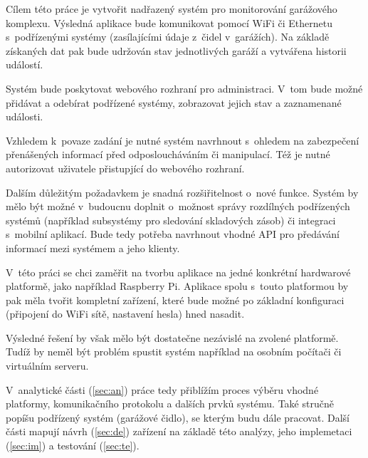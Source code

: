 Cílem této práce je vytvořit nadřazený systém pro monitorování garážového komplexu. Výsledná aplikace bude komunikovat pomocí WiFi či Ethernetu s~podřízenými systémy (zasílajícími údaje z~čidel v~garážích). Na základě získaných dat pak bude udržován stav jednotlivých garáží a vytvářena historii událostí.

Systém bude poskytovat webového rozhraní pro administraci. V~tom bude možné přidávat a odebírat podřízené systémy, zobrazovat jejich stav a zaznamenané události.

Vzhledem k~povaze zadání je nutné systém navrhnout s~ohledem na zabezpečení přenášených informací před odposloucháváním či manipulací. Též je nutné autorizovat uživatele přistupjící do webového rozhraní.

Dalším důležitým požadavkem je snadná rozšiřitelnost o~nové funkce. Systém by mělo být možné v~budoucnu doplnit o~možnost správy rozdílných podřízených systémů (například subsystémy pro sledování skladových zásob) či integraci s~mobilní aplikací. Bude tedy potřeba navrhnout vhodné API pro předávání informací mezi systémem a jeho klienty. 

V~této práci se chci zaměřit na tvorbu aplikace na jedné konkrétní hardwarové platformě, jako například Raspberry Pi. Aplikace spolu s~touto platformou by pak měla tvořit kompletní zařízení, které bude možné po základní konfiguraci (připojení do WiFi sítě, nastavení hesla) hned nasadit.

Výsledné řešení by však mělo být dostatečne nezávislé na zvolené platformě. Tudíž by neměl být problém spustit systém například na osobním počítači či virtuálním serveru.

V~analytické části (\ref{sec:an}) práce tedy přiblížím proces výběru vhodné platformy, komunikačního protokolu a dalších prvků systému. Také stručně popíšu podřízený systém (garážové čidlo), se kterým budu dále pracovat. Další části mapují návrh (\ref{sec:de}) zařízení na základě této analýzy, jeho implemetaci (\ref{sec:im}) a testování (\ref{sec:te}).